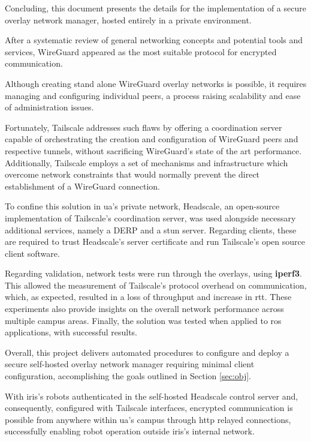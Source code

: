 \documentclass[11pt,twoside,a4paper]{report}
\begin{document}
Concluding, this document presents the details for the implementation of a secure overlay network manager, hosted entirely in a private environment.

After a systematic review of general networking concepts and potential tools and services, WireGuard appeared as the most suitable protocol for encrypted communication.

Although creating stand alone WireGuard overlay networks is possible, it requires managing and configuring individual peers, a process raising scalability and ease of administration issues.

Fortunately, Tailscale addresses such flaws by offering a coordination server capable of orchestrating the creation and configuration of WireGuard peers and respective tunnels, without sacrificing WireGuard's state of the art performance. Additionally, Tailscale employs a set of mechanisms and infrastructure which overcome network constraints that would normally prevent the direct establishment of a WireGuard connection.

To confine this solution in \ac{ua}'s private network, Headscale, an open-source implementation of Tailscale's coordination server, was used alongside necessary additional services, namely a \ac{DERP} and a \ac{stun} server. Regarding clients, these are required to trust Headscale's server certificate and run Tailscale's open source client software.

Regarding validation, network tests were run through the overlays, using \textbf{iperf3}. This allowed the measurement of Tailscale's protocol overhead on communication, which, as expected, resulted in a loss of throughput and increase in \ac{rtt}. These experiments also provide insights on the overall network performance across multiple campus areas. Finally, the solution was tested when applied to \ac{ros} applications, with successful results.

Overall, this project delivers automated procedures to configure and deploy a secure self-hosted overlay network manager requiring minimal client configuration, accomplishing the goals outlined in Section \ref{sec:obj}.

With \ac{iris}'s robots authenticated in the self-hosted Headscale control server and, consequently, configured with Tailscale interfaces, encrypted communication is possible from anywhere within \ac{ua}'s campus through \ac{http} relayed connections, successfully enabling robot operation outside \ac{iris}'s internal network.

%
%
\cleardoublepage



\cleardoublepage
\end{document}
